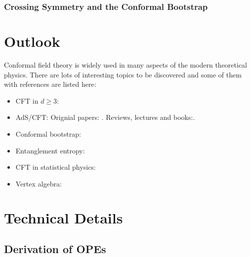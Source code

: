 \documentclass[10pt]{article}
\begin{document}
\subsubsection{Crossing Symmetry and the Conformal Bootstrap}

\clearpage
{}
\section*{Outlook}
Conformal field theory is widely used in many aspects of the modern theoretical physics.
There are lots of interesting topics to be discovered and some of them with references are listed here:
\begin{itemize}
    \item CFT in $d\geq3$: \cite{Rychkov:2016iqz}
    \item AdS/CFT: Orignial papers: \cite{Maldacena:1997re,Witten:1998qj}. Reviews, lectures and books:\cite{Ammon:2015wua,Aharony:1999ti,Erdmenger2012,Petersen:1999zh,Penedones:2016voo,Maldacena:2003nj,Nastase:2007kj,becker_becker_schwarz_2006,Kiritsis:2019npv,McMahon:2009zza,Natsuume:2014sfa,DeHaro:2015aht,Kraus2008}.
    \item Conformal bootstrap: \cite{Simmons-Duffin:2016gjk}
    \item Entanglement entropy: \cite{Calabrese:2009qy,Calabrese:2004eu,Rangamani:2016dms}
    \item CFT in statistical physics:
    \item Vertex algebra:
\end{itemize}
\clearpage
\appendix
\section{Technical Details}
\subsection{Derivation of OPEs}
\end{document}
